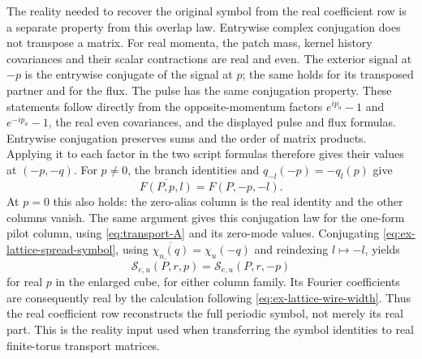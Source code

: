 The reality needed to recover the original symbol from the real coefficient
row is a separate property from this overlap law. Entrywise complex
conjugation does not transpose a matrix. For real momenta, the patch mass,
kernel history covariances and their scalar contractions are real and even. The
exterior signal at $-p$ is the entrywise conjugate of the signal at $p$;
the same holds for its transposed partner and for the flux. The pulse has
the same conjugation property. These statements follow directly from the
opposite-momentum factors $e^{ip_a}-1$ and $e^{-ip_a}-1$, the real even
covariances, and the displayed pulse and flux formulas. Entrywise
conjugation preserves sums and the order of matrix products. Applying it to
each factor in the two script formulas therefore gives their values at
$(-p,-q)$. For $p\ne0$, the branch identities and
$q_{-l}(-p)=-q_l(p)$ give
\[
 \overline{F(P,p,l)}=F(P,-p,-l).
\]
At $p=0$ this also holds: the zero-alias column is the real identity and
the other columns vanish. The same argument gives this conjugation law for
the one-form pilot column, using \eqref{eq:transport-A} and its zero-mode values. Conjugating
\eqref{eq:ex-lattice-spread-symbol}, using
$\overline{\chi_u(q)}=\chi_u(-q)$ and reindexing $l\mapsto-l$, yields
\[
 \overline{\mathcal S_{e,u}(P,r,p)}
       =\mathcal S_{e,u}(P,r,-p)
\]
for real $p$ in the enlarged cube, for either column family. Its Fourier
coefficients are consequently real by the calculation following \eqref{eq:ex-lattice-wire-width}. Thus
the real coefficient row reconstructs the full periodic symbol, not merely
its real part. This is the reality input used when transferring the symbol
identities to real finite-torus transport matrices.

